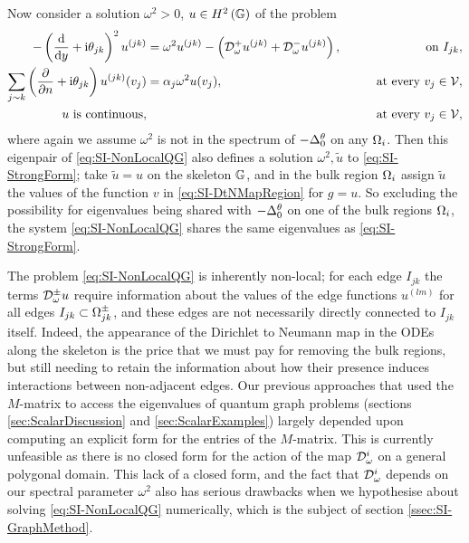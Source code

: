 Now consider a solution $\omega^2>0$, $u\in H^2\left( \mathbb{G} \right)$ of the problem
\begin{subequations} \label{eq:SI-NonLocalQG}
	\begin{align}
		- \left( \dfrac{\mathrm{d}}{\mathrm{d}y} + \mathrm{i}\theta_{jk} \right)^2u^{(jk)} 
		&= \omega^2 u^{(jk)} - \left(  \mathcal{D}^+_\omega u^{(jk)} + \mathcal{D}^-_\omega u^{(jk)} \right),
		&\qquad\text{on } I_{jk}, \label{eq:SI-NonLocalQGEdgeEquation}  \\
		\sum_{j\sim k} \left( \dfrac{\partial }{\partial n}+\mathrm{i}\theta_{jk} \right) u^{(jk)}(v_j) &= \alpha_j\omega^2 u(v_j),
		&\qquad\text{at every } v_j\in\mathcal{V}, \label{eq:SI-NonLocalQGVertexDeriv} \\
		u \text{ is continuous,} & 
		&\qquad\text{at every } v_j\in\mathcal{V}, \label{eq:SI-NonLocalQGVertexCont}
	\end{align}
\end{subequations}
where again we assume $\omega^2$ is not in the spectrum of $-\Delta^\theta_0$ on any $\Omega_i$.
Then this eigenpair of \eqref{eq:SI-NonLocalQG} also defines a solution $\omega^2, \tilde{u}$ to \eqref{eq:SI-StrongForm}; take $\tilde{u}=u$ on the skeleton $\mathbb{G}$, and in the bulk region $\Omega_i$ assign $\tilde{u}$ the values of the function $v$ in \eqref{eq:SI-DtNMapRegion} for $g=u$.
So excluding the possibility for eigenvalues being shared with $-\Delta^\theta_0$ on one of the bulk regions $\Omega_i$, the system \eqref{eq:SI-NonLocalQG} shares the same eigenvalues as \eqref{eq:SI-StrongForm}.

The problem \eqref{eq:SI-NonLocalQG} is inherently non-local; for each edge $I_{jk}$ the terms $\mathcal{D}^{\pm}_\omega u$ require information about the values of the edge functions $u^{(lm)}$ for all edges $I_{jk}\subset\Omega_{jk}^{\pm}$, and these edges are not necessarily directly connected to $I_{jk}$ itself.
Indeed, the appearance of the Dirichlet to Neumann map in the ODEs along the skeleton is the price that we must pay for removing the bulk regions, but still needing to retain the information about how their presence induces interactions between non-adjacent edges.
Our previous approaches that used the $M$-matrix to access the eigenvalues of quantum graph problems (sections \ref{sec:ScalarDiscussion} and \ref{sec:ScalarExamples}) largely depended upon computing an explicit form for the entries of the $M$-matrix.
This is currently unfeasible as there is no closed form for the action of the map $\mathcal{D}^i_\omega$ on a general polygonal domain.
This lack of a closed form, and the fact that $\mathcal{D}^i_\omega$ depends on our spectral parameter $\omega^2$  also has serious drawbacks when we hypothesise about solving \eqref{eq:SI-NonLocalQG} numerically, which is the subject of section \ref{ssec:SI-GraphMethod}.

